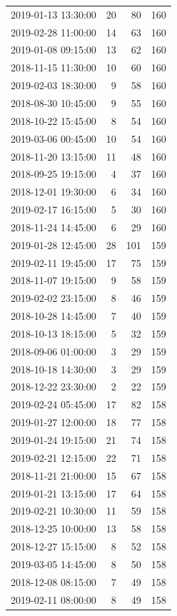 \begin{tabular}{lrrr}
2019-01-13 13:30:00 & 20 & 80 & 160 \\
2019-02-28 11:00:00 & 14 & 63 & 160 \\
2019-01-08 09:15:00 & 13 & 62 & 160 \\
2018-11-15 11:30:00 & 10 & 60 & 160 \\
2019-02-03 18:30:00 & 9 & 58 & 160 \\
2018-08-30 10:45:00 & 9 & 55 & 160 \\
2018-10-22 15:45:00 & 8 & 54 & 160 \\
2019-03-06 00:45:00 & 10 & 54 & 160 \\
2018-11-20 13:15:00 & 11 & 48 & 160 \\
2018-09-25 19:15:00 & 4 & 37 & 160 \\
2018-12-01 19:30:00 & 6 & 34 & 160 \\
2019-02-17 16:15:00 & 5 & 30 & 160 \\
2018-11-24 14:45:00 & 6 & 29 & 160 \\
2019-01-28 12:45:00 & 28 & 101 & 159 \\
2019-02-11 19:45:00 & 17 & 75 & 159 \\
2018-11-07 19:15:00 & 9 & 58 & 159 \\
2019-02-02 23:15:00 & 8 & 46 & 159 \\
2018-10-28 14:45:00 & 7 & 40 & 159 \\
2018-10-13 18:15:00 & 5 & 32 & 159 \\
2018-09-06 01:00:00 & 3 & 29 & 159 \\
2018-10-18 14:30:00 & 3 & 29 & 159 \\
2018-12-22 23:30:00 & 2 & 22 & 159 \\
2019-02-24 05:45:00 & 17 & 82 & 158 \\
2019-01-27 12:00:00 & 18 & 77 & 158 \\
2019-01-24 19:15:00 & 21 & 74 & 158 \\
2019-02-21 12:15:00 & 22 & 71 & 158 \\
2018-11-21 21:00:00 & 15 & 67 & 158 \\
2019-01-21 13:15:00 & 17 & 64 & 158 \\
2019-02-21 10:30:00 & 11 & 59 & 158 \\
2018-12-25 10:00:00 & 13 & 58 & 158 \\
2018-12-27 15:15:00 & 8 & 52 & 158 \\
2019-03-05 14:45:00 & 8 & 50 & 158 \\
2018-12-08 08:15:00 & 7 & 49 & 158 \\
2019-02-11 08:00:00 & 8 & 49 & 158 \\

\end{tabular}

